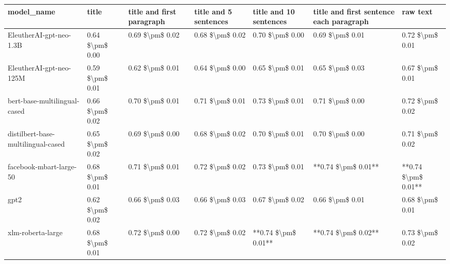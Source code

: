 \begin{tabular}{lllllll}
\toprule
                        model\_name &           title & title and first paragraph & title and 5 sentences & title and 10 sentences & title and first sentence each paragraph &            raw text \\
\midrule
           EleutherAI-gpt-neo-1.3B & 0.64 \$\textbackslash pm\$ 0.00 &           0.69 \$\textbackslash pm\$ 0.02 &       0.68 \$\textbackslash pm\$ 0.02 &        0.70 \$\textbackslash pm\$ 0.00 &                         0.69 \$\textbackslash pm\$ 0.01 &     0.72 \$\textbackslash pm\$ 0.01 \\
           EleutherAI-gpt-neo-125M & 0.59 \$\textbackslash pm\$ 0.01 &           0.62 \$\textbackslash pm\$ 0.01 &       0.64 \$\textbackslash pm\$ 0.00 &        0.65 \$\textbackslash pm\$ 0.01 &                         0.65 \$\textbackslash pm\$ 0.03 &     0.67 \$\textbackslash pm\$ 0.01 \\
      bert-base-multilingual-cased & 0.66 \$\textbackslash pm\$ 0.02 &           0.70 \$\textbackslash pm\$ 0.01 &       0.71 \$\textbackslash pm\$ 0.01 &        0.73 \$\textbackslash pm\$ 0.01 &                         0.71 \$\textbackslash pm\$ 0.00 &     0.72 \$\textbackslash pm\$ 0.02 \\
distilbert-base-multilingual-cased & 0.65 \$\textbackslash pm\$ 0.02 &           0.69 \$\textbackslash pm\$ 0.00 &       0.68 \$\textbackslash pm\$ 0.02 &        0.70 \$\textbackslash pm\$ 0.01 &                         0.70 \$\textbackslash pm\$ 0.00 &     0.71 \$\textbackslash pm\$ 0.02 \\
           facebook-mbart-large-50 & 0.68 \$\textbackslash pm\$ 0.01 &           0.71 \$\textbackslash pm\$ 0.01 &       0.72 \$\textbackslash pm\$ 0.02 &        0.73 \$\textbackslash pm\$ 0.01 &                     **0.74 \$\textbackslash pm\$ 0.01** & **0.74 \$\textbackslash pm\$ 0.01** \\
                              gpt2 & 0.62 \$\textbackslash pm\$ 0.02 &           0.66 \$\textbackslash pm\$ 0.03 &       0.66 \$\textbackslash pm\$ 0.03 &        0.67 \$\textbackslash pm\$ 0.02 &                         0.66 \$\textbackslash pm\$ 0.01 &     0.68 \$\textbackslash pm\$ 0.01 \\
                 xlm-roberta-large & 0.68 \$\textbackslash pm\$ 0.01 &           0.72 \$\textbackslash pm\$ 0.00 &       0.72 \$\textbackslash pm\$ 0.02 &    **0.74 \$\textbackslash pm\$ 0.01** &                     **0.74 \$\textbackslash pm\$ 0.02** &     0.73 \$\textbackslash pm\$ 0.02 \\
\bottomrule
\end{tabular}
